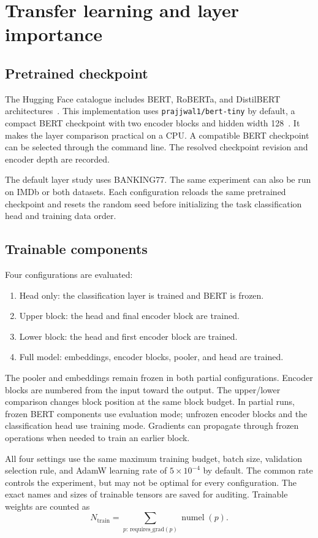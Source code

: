 \documentclass[11pt,a4paper]{article}
\begin{document}
\section{Transfer learning and layer importance}
\subsection{Pretrained checkpoint}
The Hugging Face catalogue includes BERT, RoBERTa, and DistilBERT
architectures~\cite{models}. This implementation uses
\texttt{prajjwal1/bert-tiny} by default, a compact BERT checkpoint
with two encoder blocks and hidden width 128~\cite{berttiny}.
It makes the layer comparison practical on a CPU.
A compatible BERT checkpoint can be selected through the command line.
The resolved checkpoint revision and encoder depth are recorded.

The default layer study uses BANKING77. The same experiment can also
be run on IMDb or both datasets. Each configuration reloads the same
pretrained checkpoint and resets the random seed before initializing
the task classification head and training data order.

\clearpage
\subsection{Trainable components}
Four configurations are evaluated:
\begin{enumerate}
\item Head only: the classification layer is trained and BERT is frozen.
\item Upper block: the head and final encoder block are trained.
\item Lower block: the head and first encoder block are trained.
\item Full model: embeddings, encoder blocks, pooler, and head are trained.
\end{enumerate}
The pooler and embeddings remain frozen in both partial configurations.
Encoder blocks are numbered from the input toward the output.
The upper/lower comparison changes block position at the same block
budget. In partial runs, frozen BERT components use evaluation mode;
unfrozen encoder blocks and the classification head use training mode.
Gradients can propagate through frozen operations when needed to train
an earlier block.

All four settings use the same maximum training budget, batch size,
validation selection rule, and AdamW learning rate of
$5\times10^{-4}$ by default. The common rate controls the experiment,
but may not be optimal for every configuration.
The exact names and sizes of trainable tensors are saved for auditing.
Trainable weights are counted as
\begin{equation}
N_{\mathrm{train}} =
\sum_{p:\,\mathrm{requires\_grad}(p)}\operatorname{numel}(p).
\end{equation}
\end{document}
